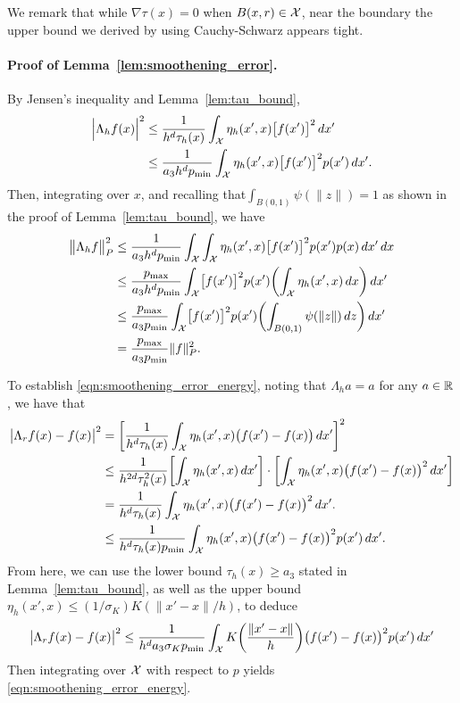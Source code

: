 We remark that while $\nabla\tau(x) = 0$ when $B(x,r) \in \mathcal{X}$, near the boundary the upper bound we derived by using Cauchy-Schwarz appears tight. 

\paragraph{Proof of Lemma~\ref{lem:smoothening_error}.}
By Jensen's inequality and Lemma~\ref{lem:tau_bound},
\begin{align*}
\Bigl|\Lambda_hf(x)\Bigr|^2 & \leq \frac{1}{h^d\tau_h(x)}\int_{\mathcal{X}} \eta_h(x',x) \bigl[f(x')\bigr]^2 \,dx' \\
& \leq \frac{1}{a_3 h^dp_{\min}}\int_{\mathcal{X}} \eta_h(x',x) \bigl[f(x')\bigr]^2 p(x') \,dx'.
\end{align*}
Then, integrating over $x$, and recalling that$\int_{B(0,1)} \psi(\|z\|) = 1$ as shown in the proof of Lemma~\ref{lem:tau_bound}, we have
\begin{align*}
\bigl\|\Lambda_hf\bigr\|_{P}^2 & \leq \frac{1}{a_3h^d p_{\min}} \int_{\mathcal{X}} \int_{\mathcal{X}} \eta_h(x',x) \bigl[f(x')\bigr]^2 p(x') p(x) \,dx' \,dx \\ 
& \leq \frac{p_{\max}}{a_3h^dp_{\min}} \int_{\mathcal{X}} \bigl[f(x')\bigr]^2 p(x') \biggl(\int_{\mathcal{X}} \eta_h(x',x) \,dx\biggr) \,dx' \\
& \leq \frac{p_{\max}}{a_3p_{\min}} \int_{\mathcal{X}} \bigl[f(x')\bigr]^2 p(x') \biggl(\int_{B(0,1)} \psi(\|z\|) \,dz\biggr) \,dx' \\
& = \frac{p_{\max}}{a_3p_{\min}} \|f\|_{P}^2.
\end{align*}

To establish \eqref{eqn:smoothening_error_energy}, noting that $\Lambda_ha = a$ for any $a \in \mathbb{R}$, we have that
\begin{align*}
\bigl|\Lambda_rf(x) - f(x)\bigr|^2 & = \biggl[\frac{1}{h^d\tau_h(x)} \int_{\mathcal{X}} \eta_h(x',x) \bigl(f(x') - f(x)\bigr) \,dx'\biggr]^2 \\
& \leq \frac{1}{h^{2d} \tau_h^2(x)} \biggl[\int_{\mathcal{X}} \eta_h(x',x) \,dx'\biggr] \cdot \biggl[\int_{\mathcal{X}} \eta_h(x',x) \bigl(f(x') - f(x)\bigr)^2 \,dx'\biggr] \\
& = \frac{1}{h^d \tau_h(x)} \int_{\mathcal{X}} \eta_h(x',x) \bigl(f(x') - f(x)\bigr)^2 \,dx'. \\
& \leq \frac{1}{h^d \tau_h(x) p_{\min}} \int_{\mathcal{X}} \eta_h(x',x) \bigl(f(x') - f(x)\bigr)^2 p(x') \,dx'.
\end{align*}
From here, we can use the lower bound $\tau_h(x) \geq a_3$ stated in Lemma~\ref{lem:tau_bound}, as well as the upper bound $\eta_h(x',x) \leq (1/\sigma_K) K(\|x' - x\|/h)$, to deduce
\begin{equation*}
\bigl|\Lambda_rf(x) - f(x)\bigr|^2 \leq \frac{1}{h^{d} a_3 \sigma_K p_{\min}} \int_{\mathcal{X}} K\biggl(\frac{\|x' - x\|}{h}\biggr) \bigl(f(x') - f(x)\bigr)^2 p(x') \,dx'
\end{equation*}
Then integrating over $\mathcal{X}$ with respect to $p$ yields \eqref{eqn:smoothening_error_energy}.

